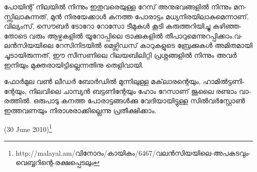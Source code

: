 ­പോ­യി­ന്റ് നി­ല­യില്‍ നി­ന്നും ഇതു­വ­രെ­യു­ള്ള റേ­സ് അനു­ഭ­വ­ങ്ങ­ളില്‍ നി­ന്നും മന­സ്സി­ലാ­കു­ന്ന­ത്, മുന്‍ നി­ര­യേ­ക്കാള്‍ കന­ത്ത 
പോ­രാ­ട്ടം മധ്യ­നി­ര­യി­ലാ­കു­മെ­ന്നാ­ണ്. വി­ല്യം­സ്, ­സൌ­ബര്‍ ­ടോ­റോ റോ­സോ­ ടീ­മു­കള്‍ കൂ­ടി കരു­ത്ത­റി­യി­ച്ചു കഴി­ഞ്ഞ­തോ­ടെ
വരും ആഴ്ച­ക­ളില്‍ യൂ­റോ­പ്പി­ലെ ട്രാ­ക്കു­ക­ളില്‍ തീ­പാ­റു­മെ­ന്നു­റ­പ്പി­ക്കാം­.­വ­ലന്‍­സി­യ­യി­ലെ റേ­സി­നി­ട­യില്‍ ­മെ­ഴ്സി­ഡ­സ് 
കാ­റു­ക­ളു­ടെ ബ്രേ­ക്കു­കള്‍ അമി­ത­മാ­യി ചൂ­ടാ­യി­രു­ന്ന­ത്, ഈ സീ­സ­ണി­ലെ റി­ല­യ­ബി­ലി­റ്റി പ്ര­ശ്ന­ങ്ങ­ളില്‍ നി­ന്നും അവര്‍ ഇനി­യും 
മു­ക്ത­രാ­യി­ട്ടി­ല്ലെ­ന്ന­തി­നു തെ­ളി­വാ­യി­.

­ഫോര്‍­മുല വണ്‍ ലീ­ഡര്‍ ബോര്‍­ഡില്‍ മു­ന്നി­ലു­ള്ള മക്‌­ലാ­ര­ന്റെ­യും, ഹാ­മില്‍­ട്ട­ണി­ന്റേ­യും, നി­ല­വി­ലെ ചാ­മ്പ്യന്‍ ബട്ട­ണി­ന്റേ­യും
ഹോം റേ­സാ­ണ് ജൂ­ലൈ രണ്ടാം വാ­ര­ത്തില്‍. ഒരു­പാ­ടു കന­ത്ത പോ­രാ­ട്ട­ങ്ങള്‍­ക്കു വേ­ദി­യാ­യി­ട്ടു­ള്ള ­സില്‍­വര്‍­സ്റ്റോണ്‍ 
ഇത്ത­വ­ണ­യും നി­രാ­ശ­രാ­ക്കി­ല്ലെ­ന്നു പ്ര­തീ­ക്ഷി­ക്കാം­.

(30 June 2010)\footnote{http://malayal.am/വിനോദം/കായികം/6467/വലന്‍സിയയിലെ-അപകടവും-വെബ്ബറിന്റെ-രക്ഷപ്പെടലും}

\newpage
